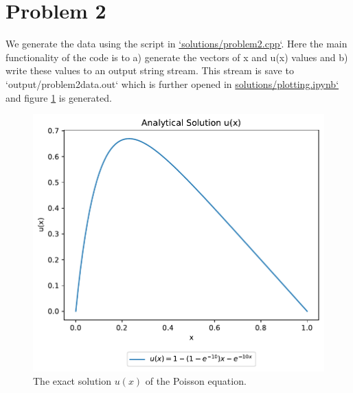 \documentclass[final, 3p, times, 11.5pt]{article}
\begin{document}
\section*{Problem 2}

We generate the data using the script in \href{https://github.com/Johannesfjeldsaa/FYS3150/blob/Project1/Project1/solutions/problem2.cpp}{`solutions/problem2.cpp`}. Here the main functionality of the code is to a) generate the vectors of x and u(x) values and b) write these values to an output string stream. This stream is save to `output/problem2data.out` which is further opened in \href{https://github.com/Johannesfjeldsaa/FYS3150/blob/Project1/Project1/solutions/plotting.ipynb}{solutions/plotting.ipynb`} and figure \ref{fig:problem2} is generated.

\begin{figure}[h!]
    \centering
    \includegraphics[width=0.6\linewidth]{Project 1/Figurer/problem2fig.pdf}
    \caption{The exact solution $u(x)$ of the Poisson equation.}
    \label{fig:problem2}
\end{figure}
\end{document}
